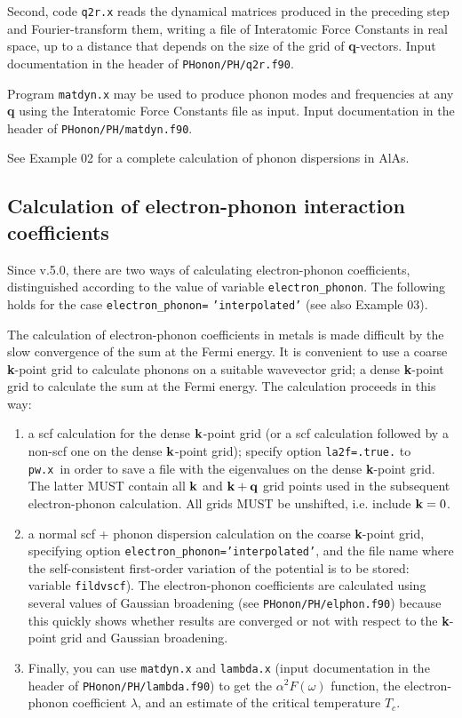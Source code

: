 \documentclass[12pt,a4paper]{article}
\def\pwx{\texttt{pw.x}}
\begin{document}
Second, code \texttt{q2r.x} reads the dynamical matrices produced in the
preceding step and Fourier-transform them, writing a file of Interatomic Force
Constants in real space, up to a distance that depends on the size of the grid
of {\bf q}-vectors. Input documentation in the header of \texttt{PHonon/PH/q2r.f90}.

Program \texttt{matdyn.x} may be used to produce phonon modes and
frequencies at any {\bf q} using the Interatomic Force Constants file as input.
Input documentation in the header of \texttt{PHonon/PH/matdyn.f90}.

See Example 02 for a complete calculation of phonon dispersions in AlAs.

\subsection{Calculation of electron-phonon interaction coefficients}

Since v.5.0, there are two ways of calculating electron-phonon
coefficients, distinguished according to the value of variable 
\texttt{electron\_phonon}. The following holds for the case 
\texttt{electron\_phonon=} {\tt'interpolated'} (see also Example 03).

The calculation of electron-phonon coefficients in metals is made difficult 
by the slow convergence of the sum at the Fermi energy. It is convenient to 
use a coarse {\bf k}-point grid to calculate phonons on a suitable 
wavevector grid;
a dense {\bf k}-point grid to calculate the sum at the Fermi energy. 
The calculation
proceeds in this way:
\begin{enumerate}
\item a scf calculation for the dense ${\bf k}$-point grid (or a scf calculation 
followed by a non-scf one on the dense ${\bf k}$-point grid); specify 
option \texttt{la2f=.true.} to \pwx\ in order to save a file with 
the eigenvalues on the dense {\bf k}-point grid. The latter MUST contain 
all ${\bf k}$ and ${\bf k}+{\bf q}$ grid points used in the subsequent 
electron-phonon 
calculation. All grids MUST be unshifted, i.e. include ${\bf k}=0$.
\item a normal scf + phonon dispersion calculation on the coarse {\bf k}-point
grid, specifying option \texttt{electron\_phonon='interpolated'}, and 
the file name where
the self-consistent first-order variation of the potential is to be 
stored: variable \texttt{fildvscf}).
The electron-phonon coefficients are calculated using several
values of Gaussian broadening (see \texttt{PHonon/PH/elphon.f90}) 
because this quickly
shows whether results are converged or not with respect to the 
{\bf k}-point grid and Gaussian broadening.
\item Finally, you can use \texttt{matdyn.x} and \texttt{lambda.x} 
(input documentation in the header of \texttt{PHonon/PH/lambda.f90})
to get the $\alpha^2F(\omega)$ function, the electron-phonon coefficient
$\lambda$, and an estimate of the critical temperature $T_c$.
\end{enumerate}
\end{document}
